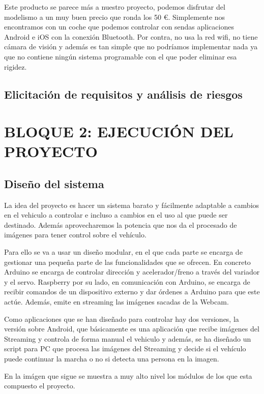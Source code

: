 \documentclass{pclass}
\begin{document}
Este producto se parece más a nuestro proyecto, podemos disfrutar del modelismo a un muy buen precio que ronda los 50 \euro. Simplemente nos encontramos con un coche que podemos controlar con sendas aplicaciones Android e iOS con la conexión Bluetooth. Por contra, no usa la red wifi, no tiene cámara de visión y además es tan simple que no podríamos implementar nada ya que no contiene ningún sistema programable con el que poder eliminar esa rigidez.



\section{Elicitación de requisitos y análisis de riesgos}


\chapter{BLOQUE 2: EJECUCIÓN DEL PROYECTO}
\section{Diseño del sistema}

La idea del proyecto es hacer un sistema barato y fácilmente adaptable a cambios en el vehiculo a controlar e incluso a cambios en el uso al que puede ser destinado. Además aprovecharemos la potencia que nos da el procesado de imágenes para tener control sobre el vehículo.

Para ello se va a usar un diseño modular, en el que cada parte se encarga de gestionar una pequeña parte de las funcionalidades que se ofrecen. En concreto Arduino se encarga de controlar dirección y acelerador/freno a través del variador y el servo. Raspberry por su lado, en comunicación con Arduino, se encarga de recibir comandos de un dispositivo externo y dar órdenes a Arduino para que este actúe. Además, emite en streaming las imágenes sacadas de la Webcam. 

Como aplicaciones que se han diseñado para controlar hay dos versiones, la versión sobre Android, que básicamente es una aplicación que recibe imágenes del Streaming y controla de forma manual el vehiculo y además, se ha diseñado un script para PC que procesa las imágenes del Streaming y decide si el vehículo puede continuar la marcha o no si detecta una persona en la imagen.

En la imágen que sigue se muestra a muy alto nivel los módulos de los que esta compuesto el proyecto.
\end{document}
